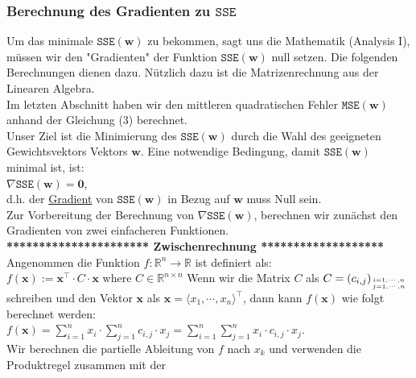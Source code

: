 \documentclass[12pt]{article}
\begin{document}
\subsubsection{Berechnung des Gradienten zu $\mathtt{SSE}$}
%
Um das minimale  $\mathtt{SSE}(\mathbf{w})$ zu bekommen, sagt uns die Mathematik (Analysis I), müssen wir den "Gradienten" der Funktion $\mathtt{SSE}(\mathbf{w})$ null setzen. Die folgenden Berechnungen dienen dazu. Nützlich dazu ist die Matrizenrechnung aus der Linearen Algebra.\\[0.2cm]
%
Im letzten Abschnitt haben wir den mittleren quadratischen Fehler $\mathtt{MSE}(\mathbf{w})$ anhand der Gleichung (3) berechnet.\\
Unser Ziel ist die Minimierung des $\mathtt{SSE}(\mathbf{w})$ durch die Wahl des geeigneten Gewichtsvektors Vektors $\mathbf{w}$.  Eine notwendige Bedingung, damit $\mathtt{SSE}(\mathbf{w})$ minimal ist, ist: 
\\[0.2cm]
\hspace*{1.3cm}
$\nabla \mathtt{SSE}(\mathbf{w}) = \mathbf{0}$,
\\[0.2cm]
d.h. der \href{https://en.wikipedia.org/wiki/Gradient}{Gradient}  von $\mathtt{SSE}(\mathbf{w})$ in Bezug auf $\mathbf{w}$ muss Null sein. \\
Zur Vorbereitung der Berechnung von $\nabla \mathtt{SSE}(\mathbf{w})$, berechnen wir zunächst den Gradienten von zwei einfacheren Funktionen.\\[0.4cm]
\textbf{********************** Zwischenrechnung *******************}\\[0.4cm]
%
Angenommen die Funktion $f:\mathbb{R}^n \rightarrow \mathbb{R}$ ist definiert als:
\\[0.2cm]
\hspace*{1.3cm}
$f(\mathbf{x}) := \mathbf{x}^\top \cdot C \cdot \mathbf{x}$ \quad where $C \in \mathbb{R}^{n \times n}$
%
Wenn wir die Matrix $C$ als $C = (c_{i,j})_{i=1,\cdots,n \atop j=1,\cdots,n}$ schreiben und den Vektor
$\mathbf{x}$ als $\mathbf{x} = \langle x_1, \cdots, x_n \rangle^\top$, dann kann $f(\mathbf{x})$ wie folgt berechnet werden:
\\[0.2cm]
\hspace*{1.3cm}
$ f(\mathbf{x}) = \sum\limits_{i=1}^n x_i \cdot \sum\limits_{j=1}^n c_{i,j} \cdot x_j = \sum\limits_{i=1}^n \sum\limits_{j=1}^n x_i \cdot c_{i,j} \cdot x_j $.
\\[0.2cm]
Wir berechnen die partielle Ableitung von $f$ nach $x_k$ und verwenden die Produktregel zusammen mit der
\end{document}
